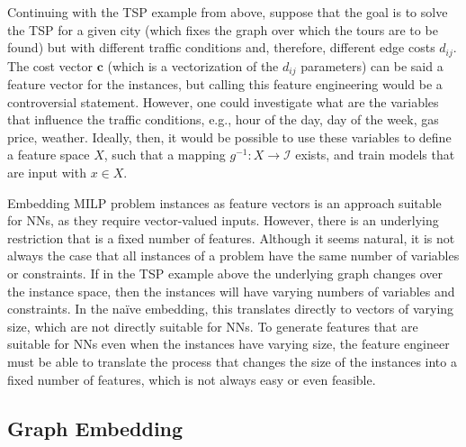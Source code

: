 Continuing with the TSP example from above, suppose that the goal is to solve the TSP for a given city (which fixes the graph over which the tours are to be found) but with different traffic conditions and, therefore, different edge costs $d_{ij}$.
The cost vector $\bm{c}$ (which is a vectorization of the $d_{ij}$ parameters) can be said a feature vector for the instances, but calling this feature engineering would be a controversial statement.
However, one could investigate what are the variables that influence the traffic conditions, e.g., hour of the day, day of the week, gas price, weather.
Ideally, then, it would be possible to use these variables to define a feature space $X$, such that a mapping $g^{-1}: X \longrightarrow \mathcal{I}$ exists, and train models that are input with $x\in X$.

Embedding MILP problem instances as feature vectors is an approach suitable for NNs, as they require vector-valued inputs.
However, there is an underlying restriction that is a fixed number of features.
Although it seems natural, it is not always the case that all instances of a problem have the same number of variables or constraints.
If in the TSP example above the underlying graph changes over the instance space, then the instances will have varying numbers of variables and constraints.
In the naïve embedding, this translates directly to vectors of varying size, which are not directly suitable for NNs.
To generate features that are suitable for NNs even when the instances have varying size, the feature engineer must be able to translate the process that changes the size of the instances into a fixed number of features, which is not always easy or even feasible.

\subsection{Graph Embedding}

